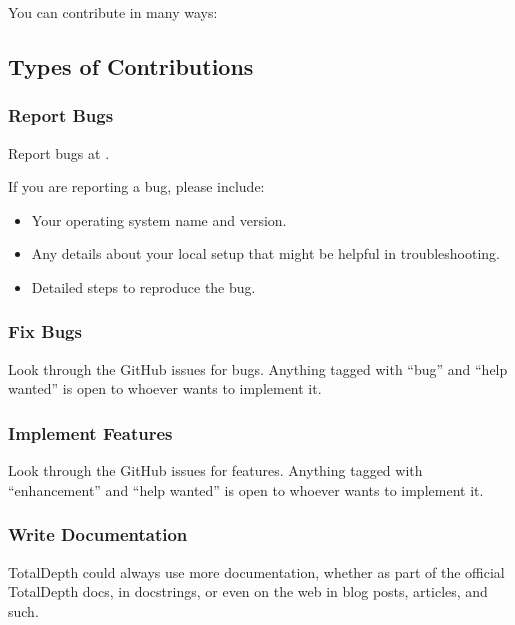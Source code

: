 \documentclass[letterpaper,10pt,english]{sphinxmanual}
\begin{document}
You can contribute in many ways:


\subsection{Types of Contributions}
\label{\detokenize{contributing:types-of-contributions}}

\subsubsection{Report Bugs}
\label{\detokenize{contributing:report-bugs}}
Report bugs at .

If you are reporting a bug, please include:
\begin{itemize}
\item {} 
Your operating system name and version.

\item {} 
Any details about your local setup that might be helpful in troubleshooting.

\item {} 
Detailed steps to reproduce the bug.

\end{itemize}


\subsubsection{Fix Bugs}
\label{\detokenize{contributing:fix-bugs}}
Look through the GitHub issues for bugs. Anything tagged with “bug”
and “help wanted” is open to whoever wants to implement it.


\subsubsection{Implement Features}
\label{\detokenize{contributing:implement-features}}
Look through the GitHub issues for features. Anything tagged with “enhancement”
and “help wanted” is open to whoever wants to implement it.


\subsubsection{Write Documentation}
\label{\detokenize{contributing:write-documentation}}
TotalDepth could always use more documentation, whether as part of the
official TotalDepth docs, in docstrings, or even on the web in blog posts,
articles, and such.
\end{document}
